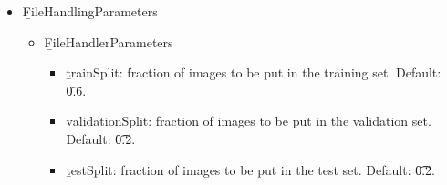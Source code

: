 \begin{itemize}
    \item \b{FileHandlingParameters}
    \begin{itemize}
        \item \b{FileHandlerParameters}
        \begin{itemize}
            \item \b{trainSplit}: fraction of images to be put in the training set. Default: \t{0.6}.
            \item \b{validationSplit}: fraction of images to be put in the validation set. Default: \t{0.2}.
            \item \b{testSplit}: fraction of images to be put in the test set. Default: \t{0.2}.
        \end{itemize}
    \end{itemize}
\end{itemize}